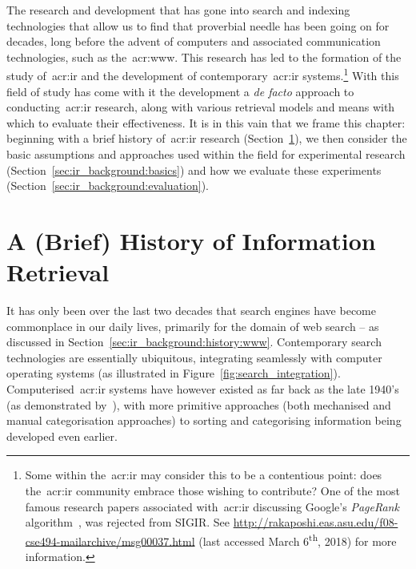 The research and development that has gone into search and indexing technologies that allow us to find that proverbial needle has been going on for decades, long before the advent of computers and associated communication technologies, such as the~\gls{acr:www}. This research has led to the formation of the study of~\gls{acr:ir} and the development of contemporary~\gls{acr:ir} systems.\footnote{Some within the~\gls{acr:ir} may consider this to be a contentious point: does the~\gls{acr:ir} community embrace those wishing to contribute? One of the most famous research papers associated with~\gls{acr:ir} discussing Google's \emph{PageRank} algorithm~\citep{page1998pagerank}, was rejected from SIGIR. See \url{http://rakaposhi.eas.asu.edu/f08-cse494-mailarchive/msg00037.html} (last accessed March 6\textsuperscript{th}, 2018) for more information.} With this field of study has come with it the development a \emph{de facto} approach to conducting~\gls{acr:ir} research, along with various retrieval models and means with which to evaluate their effectiveness. It is in this vain that we frame this chapter: beginning with a brief history of~\gls{acr:ir} research (Section~\ref{sec:ir_background:history}), we then consider the basic assumptions and approaches used within the field for experimental research (Section~\ref{sec:ir_background:basics}) and how we evaluate these experiments (Section~\ref{sec:ir_background:evaluation}).

\section{A (Brief) History of Information Retrieval}\label{sec:ir_background:history}
It has only been over the last two decades that search engines have become commonplace in our daily lives, primarily for the domain of web search -- as discussed in Section~\ref{sec:ir_background:history:www}. Contemporary search technologies are essentially ubiquitous, integrating seamlessly with computer operating systems (as illustrated in Figure~\ref{fig:search_integration}). Computerised~\gls{acr:ir} systems have however existed as far back as the late 1940's (as demonstrated by~\citealp{holmstrom1948univac}), with more primitive approaches (both mechanised and manual categorisation approaches) to sorting and categorising information being developed even earlier.

